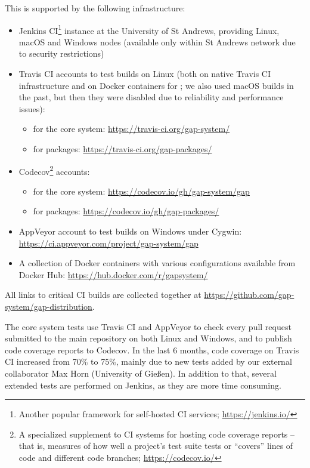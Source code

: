 \documentclass{deliverablereport}
\begin{document}
This is supported by the following infrastructure:
\begin{itemize}
\item Jenkins CI\footnote{Another popular framework for self-hosted CI
services; \url{https://jenkins.io/}} instance at the University of St Andrews,
providing Linux, macOS and Windows nodes (available only within St
Andrews network due to security restrictions)
\item Travis CI accounts to test builds on Linux (both on native 
Travis CI infrastructure and on Docker containers for \GAP; we
also used macOS builds in the past, but then they were disabled
due to reliability and performance issues):
\begin{itemize}
\item for the core \GAP system: \url{https://travis-ci.org/gap-system/}
\item for \GAP packages: \url{https://travis-ci.org/gap-packages/}
\end{itemize}
\item Codecov\footnote{A specialized supplement to CI systems for hosting code
 coverage reports -- that is, measures of how well a project's test suite
 tests or ``covers'' lines of code and different code branches;
 \url{https://codecov.io/}} accounts:
\begin{itemize}
\item for the core \GAP system: \url{https://codecov.io/gh/gap-system/gap}
\item for \GAP packages: \url{https://codecov.io/gh/gap-packages/}
\end{itemize}
\item AppVeyor account to test builds on Windows under Cygwin: \url{https://ci.appveyor.com/project/gap-system/gap}
\item A collection of Docker containers with various configurations available from
Docker Hub: \url{https://hub.docker.com/r/gapsystem/}
\end{itemize}
All links to critical CI builds are collected together
at \url{https://github.com/gap-system/gap-distribution}.

The core \GAP system tests use Travis CI and AppVeyor to check every pull
request submitted to the main \GAP repository on both Linux and Windows, and to
publish code coverage reports to Codecov. In the last 6 months, code coverage
on Travis CI increased from 70\% to 75\%, mainly due to new tests added by our
external collaborator Max Horn (University of Gie{\ss}en).  In addition to
that, several extended tests are performed on Jenkins, as they are more time
consuming.
\end{document}
